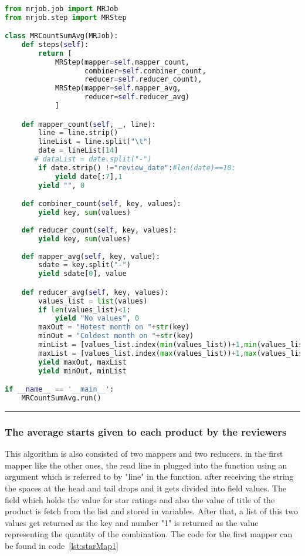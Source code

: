\renewcommand{\lstlistingname}{Code}
\lstset{style=mystyle}
\begin{lstlisting}[language=Python, caption={Number of Reviews for Each Month}, label={lst:reviewsPerMonth}, mathescape = true, breaklines=true]

from mrjob.job import MRJob
from mrjob.step import MRStep

class MRCountSumAvg(MRJob):
    def steps(self):
        return [
            MRStep(mapper=self.mapper_count,
                   combiner=self.combiner_count,
                   reducer=self.reducer_count),
            MRStep(mapper=self.mapper_avg,
                   reducer=self.reducer_avg)
            ]

    def mapper_count(self, _, line):
        line = line.strip()  
        lineList = line.split("\t")
        date = lineList[14]
       # dataList = date.split("-")
        if date.strip() !="review_date":#len(date)==10:
            yield date[:7],1
        yield "", 0

    def combiner_count(self, key, values):
        yield key, sum(values)
        
    def reducer_count(self, key, values):
        yield key, sum(values)
        
    def mapper_avg(self, key, value):
        sdate = key.split("-")
        yield sdate[0], value

    def reducer_avg(self, key, values):
        values_list = list(values)
        if len(values_list)<1:
            yield "No values", 0
        maxOut = "Hotest month on "+str(key)
        minOut = "Coldest month on "+str(key)
        minList = [values_list.index(min(values_list))+1,min(values_list)]
        maxList = [values_list.index(max(values_list))+1,max(values_list)]
        yield maxOut, maxList
        yield minOut, minList

if __name__ == '__main__':
    MRCountSumAvg.run()

\end{lstlisting}

\rule{200 pt}{0.5 pt}



\subsubsection{The average starts given to each product by the reviewers}

This algorithm is also consisted of two mappers and two reducers. in the first mapper like the other ones, the read line in plugged into the function using an argument which is referred to by "line" in the function. after receiving the string the spaces at the head and tail drops and it gets divided into field values. The field which holds the value for star ratings and also the value of title of the product is fetch from the list and stored in variables. After that, a list of this two values get returned as the key and number "1" is returned as the value representing the quantity of the combination. The  code for the first mapper can be found in code~\ref{lst:starMap1}

